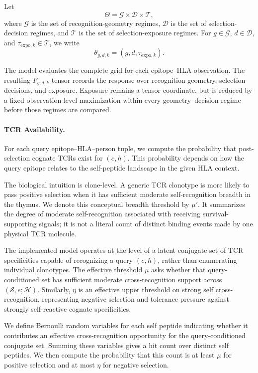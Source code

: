 \documentclass[11pt]{article}
\begin{document}
Let
\[
\Theta
=
\mathcal{G}\times\mathcal{D}\times\mathcal{T},
\]
where $\mathcal{G}$ is the set of recognition-geometry regimes,
$\mathcal{D}$ is the set of selection-decision regimes, and
$\mathcal{T}$ is the set of selection-exposure regimes.
For $g\in\mathcal{G}$, $d\in\mathcal{D}$, and
$\tau_{\mathrm{expo},k}\in\mathcal{T}$, we write
\[
\theta_{g,d,k}=(g,d,\tau_{\mathrm{expo},k}).
\]

The model evaluates the complete grid for each epitope--HLA observation. The
resulting $F_{g,d,k}$ tensor records the response over recognition geometry,
selection decisions, and exposure. Exposure remains a tensor coordinate, but
is reduced by a fixed observation-level maximization within every
geometry--decision regime before those regimes are compared.




\paragraph{TCR Availability.}
For each query epitope--HLA--person tuple, we compute the probability that post-selection cognate TCRs exist for $(e,h)$. This probability depends on how the query epitope relates to the self-peptide landscape in the given HLA context.

The biological intuition is clone-level. A generic TCR clonotype is more likely
to pass positive selection when it has sufficient moderate self-recognition
breadth in the thymus. We denote this conceptual breadth threshold by $\mu'$.
It summarizes the degree of moderate self-recognition associated with receiving
survival-supporting signals; it is not a literal count of distinct binding
events made by one physical TCR molecule.

The implemented model operates at the level of a latent conjugate set of TCR
specificities capable of recognizing a query $(e,h)$, rather than enumerating
individual clonotypes. The effective threshold $\mu$ asks whether that
query-conditioned set has sufficient moderate cross-recognition support across
$(\mathcal{S},e;\mathcal{H})$. Similarly, $\eta$ is an effective upper threshold
on strong self cross-recognition, representing negative selection and tolerance
pressure against strongly self-reactive cognate specificities.

We define Bernoulli random variables for each self peptide indicating whether it contributes an effective cross-recognition opportunity for the query-conditioned conjugate set. Summing these variables gives a hit count over distinct self peptides. We then compute the probability that this count is at least $\mu$ for positive selection and at most $\eta$ for negative selection.
\end{document}
